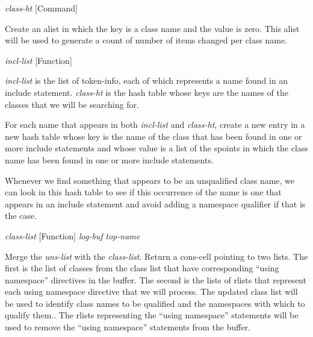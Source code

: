 \vspace{1em}
\noindent
{}
\usebox{\funcname}\emph{class-ht}
 \hfill [Command]

\begin{doc-string}
Create an alist in which the key is a class name and the value is zero.  This alist
will be used to generate a count of number of items changed per class name.
\end{doc-string}

\vspace{1em}
\noindent
{}
\usebox{\funcname}\emph{incl-list}
 \hfill [Function]
\hspace*{\wd\funcname}

\begin{doc-string}
\emph{incl-list} is the list of token-info, each of which represents a name found in
an include statement.  \emph{class-ht} is the hash table whose keys are the names of
the classes that we will be searching for.

For each name that appears in both \emph{incl-list} and \emph{class-ht}, create a new entry in
a new hash table whose key is the name of the class that has been found in one
or more include statements and whose value is a list of the spoints in which the
class name has been found in one or more include statements.

Whenever we find something that appears to be an unqualified class name, we can
look in this hash table to see if this occurrence of the name is one that
appears in an include statement and avoid adding a namespace qualifier if that
is the case.
\end{doc-string}

\vspace{1em}
\noindent
{}
\usebox{\funcname}\emph{class-list}
 \hfill [Function]
\hspace*{\wd\funcname}\emph{log-buf}
\hspace*{\wd\funcname}\emph{top-name}

\begin{doc-string}
Merge the \emph{uns-list} with the \emph{class-list}.  Return a cons-cell pointing to two
lists.  The first is the list of classes from the class list that have
corresponding ``using namespace'' directives in the buffer.  The second is the
lists of rlists that represent each using namespace directive that we will
process.
The updated class list will be used to identify class names to be qualified and
the namespaces with which to qualify them..  The rlists representing the ``using
namespace'' statements will be used to remove the ``using namespace'' statements
from the buffer.
\end{doc-string}

